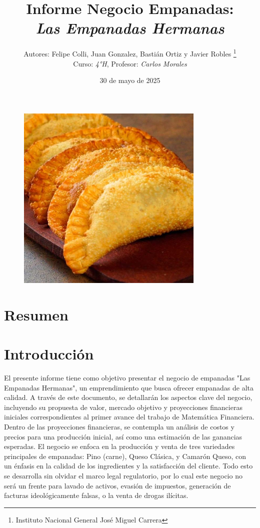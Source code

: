 \documentclass[12pt]{article}
\title{Informe Negocio Empanadas: \\
\textit{Las Empanadas Hermanas}} %
\author{Autores: Felipe Colli, Juan Gonzalez, Bastián Ortiz y Javier Robles \thanks{Instituto Nacional General José Miguel Carrera} \\
  Curso: \textit{4°H}, Profesor: \textit{Carlos Morales}} %
\date{30 de mayo de 2025} %
\begin{document}
\maketitle
\begin{figure}[h!] %
    \centering
    \includegraphics[width=0.8\textwidth]{empanadas} %
\end{figure}
\newpage

\tableofcontents
\newpage

\section{Resumen} %
\newpage



\section{Introducción} %
El presente informe tiene como objetivo presentar el negocio de empanadas "Las Empanadas Hermanas", un emprendimiento que busca ofrecer empanadas de alta calidad. A través de este documento, se detallarán los aspectos clave del negocio, incluyendo su propuesta de valor, mercado objetivo y proyecciones financieras iniciales correspondientes al primer avance del trabajo de Matemática Financiera. \\

Dentro de las proyecciones financieras, se contempla un análisis de costos y precios para una producción inicial, así como una estimación de las ganancias esperadas. El negocio se enfoca en la producción y venta de tres variedades principales de empanadas: Pino (carne), Queso Clásica, y Camarón Queso, con un énfasis en la calidad de los ingredientes y la satisfacción del cliente. Todo esto se desarrolla sin olvidar el marco legal regulatorio, por lo cual este negocio no será un frente para lavado de activos, evasión de impuestos, generación de facturas ideológicamente falsas, o la venta de drogas ilícitas. \\ %
\end{document}

